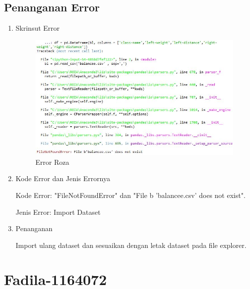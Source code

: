 \begin{enumerate}
\begin{enumerate}
\subsection{Penanganan Error}
\begin{enumerate}
\item Skrinsut Error
\begin{figure}[ht]
\centering
\includegraphics[scale=0.5]{figures/erorque.jpg}
\caption{ Error Roza}
\label{6}
\end{figure}
\item Kode Error dan Jenis Errornya
\par Kode Error: "FileNotFoundError" dan "File b 'balancee.csv' does not exist". 
\par Jenis Error: Import Dataset
\item Penanganan
\par Import ulang dataset dan sesuaikan dengan letak dataset pada file explorer.

\end{enumerate}
\end{enumerate}

\end{enumerate}





\par
\par
\section{Fadila-1164072}
